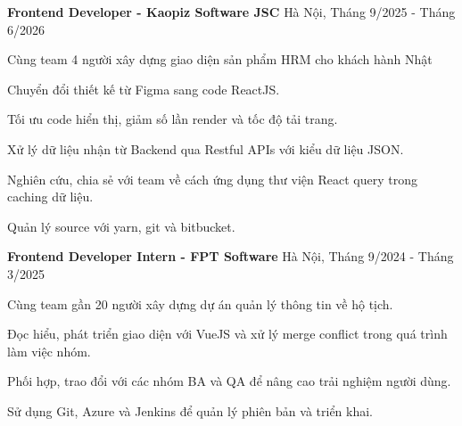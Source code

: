 \begin{cventries}
  \cvsimpleentry
    {\textbf{Frontend Developer - Kaopiz Software JSC}}
    {Hà Nội, Tháng 9/2025 - Tháng 6/2026}
    {
      \begin{cvitems}
        \item {Cùng team 4 người xây dựng giao diện sản phẩm HRM cho khách hành Nhật}
        \item {Chuyển đổi thiết kế từ Figma sang code ReactJS.}
        \item {Tối ưu code hiển thị, giảm số lần render và tốc độ tải trang.}
        \item {Xử lý dữ liệu nhận từ Backend qua Restful APIs với kiểu dữ liệu JSON.}
        \item {Nghiên cứu, chia sẻ với team về cách ứng dụng thư viện React query trong caching dữ liệu.}
        \item {Quản lý source với yarn, git và bitbucket.}
      \end{cvitems}
    }
  \vspace*{2.5mm}
  \cvsimpleentry
    {\textbf{Frontend Developer Intern - FPT Software}}
    {Hà Nội, Tháng 9/2024 - Tháng 3/2025}
    {
      \begin{cvitems}
        \item {Cùng team gần 20 người xây dựng dự án quản lý thông tin về hộ tịch.}
        \item {Đọc hiểu, phát triển giao diện với VueJS và xử lý merge conflict trong quá trình làm việc nhóm.}
        \item {Phối hợp, trao đổi với các nhóm BA và QA để nâng cao trải nghiệm người dùng.}
        \item {Sử dụng Git, Azure và Jenkins để quản lý phiên bản và triển khai.}
      \end{cvitems}
    }
\end{cventries}
